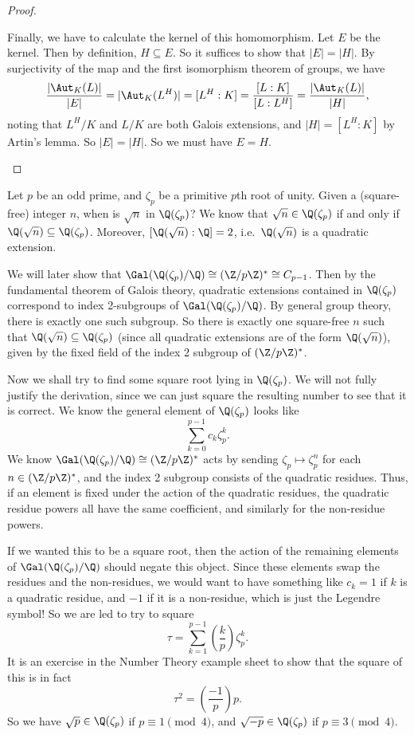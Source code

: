 \documentclass[a4paper]{article}
\begin{document}
\begin{proof}
\begin{enumerate}
      Finally, we have to calculate the kernel of this homomorphism. Let $E$ be the kernel. Then by definition, $H\subseteq E$. So it suffices to show that $|E| = |H|$. By surjectivity of the map and the first isomorphism theorem of groups, we have
      \[
        \frac{|\Aut_K(L)|}{|E|} = |\Aut_K(L^H)| = [L^H:K] = \frac{[L:K]}{[L:L^H]} = \frac{|\Aut_K(L)|}{|H|},
      \]
      noting that $L^H/K$ and $L/K$ are both Galois extensions, and $|H| = [L^H:K]$ by Artin's lemma. So $|E| = |H|$. So we must have $E = H$.
  \end{enumerate}
\end{proof}

\begin{eg}
  Let $p$ be an odd prime, and $\zeta_p$ be a primitive $p$th root of unity. Given a (square-free) integer $n$, when is $\sqrt{n}$ in $\Q(\zeta_p)$? We know that $\sqrt{n} \in \Q(\zeta_p)$ if and only if $\Q(\sqrt{n}) \subseteq \Q(\zeta_p)$. Moreover, $[\Q(\sqrt{n}):\Q] = 2$, i.e.\ $\Q(\sqrt{n})$ is a quadratic extension.

  We will later show that $\Gal(\Q(\zeta_p)/\Q) \cong (\Z/p\Z)^* \cong C_{p - 1}$. Then by the fundamental theorem of Galois theory, quadratic extensions contained in $\Q(\zeta_p)$ correspond to index 2-subgroups of $\Gal(\Q(\zeta_p)/\Q)$. By general group theory, there is exactly one such subgroup. So there is exactly one square-free $n$ such that $\Q(\sqrt{n}) \subseteq \Q(\zeta_p)$ (since all quadratic extensions are of the form $\Q(\sqrt{n})$), given by the fixed field of the index 2 subgroup of $(\Z/p\Z)^*$.

  Now we shall try to find some square root lying in $\Q(\zeta_p)$. We will not fully justify the derivation, since we can just square the resulting number to see that it is correct. We know the general element of $\Q(\zeta_p)$ looks like
  \[
    \sum_{k = 0}^{p - 1} c_k \zeta_p^k.
  \]
  We know $\Gal(\Q(\zeta_p)/\Q)\cong (\Z/p\Z)^*$ acts by sending $\zeta_p \mapsto \zeta_p^n$ for each $n \in (\Z/p\Z)^*$, and the index 2 subgroup consists of the quadratic residues. Thus, if an element is fixed under the action of the quadratic residues, the quadratic residue powers all have the same coefficient, and similarly for the non-residue powers.

  If we wanted this to be a square root, then the action of the remaining elements of $\Gal(\Q(\zeta_p)/\Q)$ should negate this object. Since these elements swap the residues and the non-residues, we would want to have something like $c_k = 1$ if $k$ is a quadratic residue, and $-1$ if it is a non-residue, which is just the Legendre symbol! So we are led to try to square
  \[
    \tau = \sum_{k = 1}^{p - 1} \left(\frac{k}{p}\right) \zeta_p^k.
  \]
  It is an exercise in the Number Theory example sheet to show that the square of this is in fact
  \[
    \tau^2 = \left(\frac{-1}{p}\right) p.
  \]
  So we have $\sqrt{p} \in \Q(\zeta_p)$ if $p \equiv 1 \pmod 4$, and $\sqrt{-p} \in \Q(\zeta_p)$ if $p \equiv 3 \pmod 4$.
\end{eg}
\end{document}

